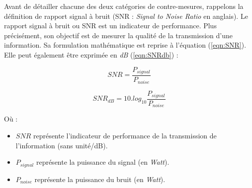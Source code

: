 \documentclass[oneside]{book}
\begin{document}
\vspace{-0.2 cm}Avant de détailler chacune des deux catégories de contre-mesures, rappelons la définition de rapport signal à bruit (SNR : \textit{Signal to Noise Ratio} en anglais). Le rapport signal à bruit ou SNR est un indicateur de performance. Plus précisément, son objectif est de mesurer la qualité de la transmission d'une information. Sa formulation mathématique est reprise à l'équation (\ref{eqn:SNR}). Elle peut également être exprimée en \textit{dB} (\ref{eqn:SNRdb}) : \\

\begin{minipage}{6cm}
\begin{equation}SNR = \frac{P_{signal}}{P_{noise}} \label{eqn:SNR} \end{equation} 
\end{minipage}
\begin{minipage}{6cm}
\begin{equation}SNR_{dB} = 10.log_{10}\frac{P_{signal}}{P_{noise}} \label{eqn:SNRdb}\end{equation}
\end{minipage}

\hspace{-0.5 cm}Où :
\begin{itemize}
\item $SNR$ représente l'indicateur de performance de la transmission de l'information (sans unité/dB).
\item $P_{signal}$ représente la puissance du signal (en \textit{Watt}).
\item $P_{noise}$ représente la puissance du bruit (en \textit{Watt}). \\
\end{itemize}
\end{document}
